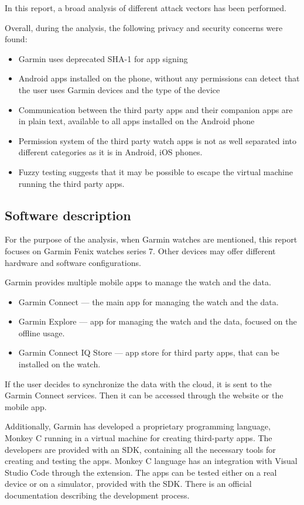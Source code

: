 In this report, a broad analysis of different attack vectors has been performed.

Overall, during the analysis, the following privacy and security concerns were found:
\begin{itemize}
    \item Garmin uses deprecated SHA-1 for app signing
    \item Android apps installed on the phone, without any permissions can detect that the user uses Garmin devices and the type of the device
    \item Communication between the third party apps and their companion apps are in plain text, available to all apps installed on the Android phone
    \item Permission system of the third party watch apps is not as well separated into different categories as it is in Android, iOS phones.
    \item Fuzzy testing suggests that it may be possible to escape the virtual machine running the third party apps.
\end{itemize}


\subsection{Software description}

For the purpose of the analysis, when Garmin watches are mentioned, this report focuses on Garmin Fenix watches series 7.
Other devices may offer different hardware and software configurations.

Garmin provides multiple mobile apps to manage the watch and the data.
\begin{itemize}
    \item Garmin Connect — the main app for managing the watch and the data.
    \item Garmin Explore — app for managing the watch and the data, focused on the offline usage.
    \item Garmin Connect IQ Store — app store for third party apps, that can be installed on the watch.
\end{itemize}

If the user decides to synchronize the data with the cloud, it is sent to the Garmin Connect services.
Then it can be accessed through the website or the mobile app.

Additionally, Garmin has developed a proprietary programming language, Monkey C running in a virtual machine for creating third-party apps.
The developers are provided with an SDK, containing all the necessary tools for creating and testing the apps.
Monkey C language has an integration with Visual Studio Code through the extension.
The apps can be tested either on a real device or on a simulator, provided with the SDK\@.
There is an official documentation describing the development process.

